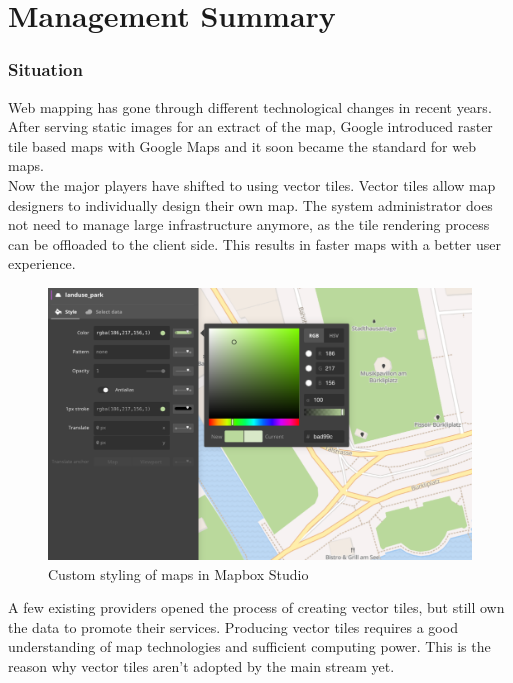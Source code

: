 
\begingroup
\let\clearpage\relax
\let\cleardoublepage\relax
\let\cleardoublepage\relax

\chapter*{Management Summary}
\label{management-summary}

\subsection*{Situation}\label{introduction}

Web mapping has gone through different technological changes in recent years. 
After serving static images for an extract of the map, Google introduced raster tile based maps with Google Maps and it soon became the standard for web maps.\\
Now the major players have shifted to using vector tiles. Vector tiles allow map designers to individually design their own map. The system administrator does not need to manage large infrastructure anymore, as the tile rendering process can be offloaded to the client side. This results in faster maps with a better user experience.
\begin{figure}[H]
  \includegraphics[width=1\textwidth]{images/custom_map.png}
  \caption{Custom styling of maps in Mapbox Studio}
\end{figure}
A few existing providers opened the process of creating vector tiles, but still own the data to promote their services. Producing vector tiles requires a good understanding of map technologies and sufficient computing power. This is the reason why vector tiles aren't adopted by the main stream yet.

